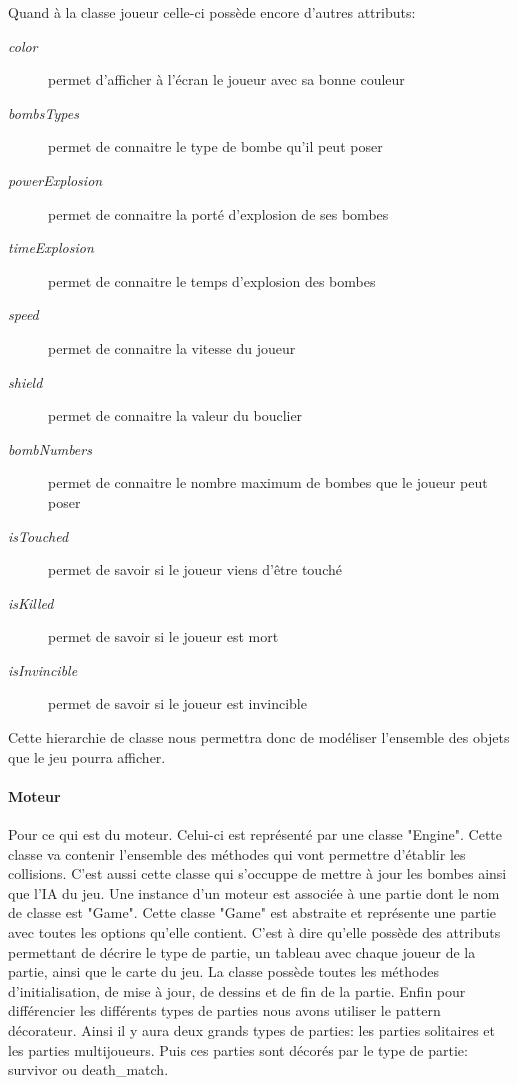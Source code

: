 	Quand à la classe joueur celle-ci possède encore d'autres attributs: 
	\begin{description}
		\item [\textit{color}]{permet d'afficher à l'écran le joueur avec sa bonne couleur}
		\item [\textit{bombsTypes}]{permet de connaitre le type de bombe qu'il peut poser}
		\item [\textit{powerExplosion}]{permet de connaitre la porté d'explosion de ses bombes}
		\item [\textit{timeExplosion}]{permet de connaitre le temps d'explosion des bombes}
		\item [\textit{speed}]{permet de connaitre la vitesse du joueur}
		\item [\textit{shield}]{permet de connaitre la valeur du bouclier}
		\item [\textit{bombNumbers}]{permet de connaitre le nombre maximum de bombes que le joueur peut poser}
		\item [\textit{isTouched}]{permet de savoir si le joueur viens d'être touché}
		\item [\textit{isKilled}]{permet de savoir si le joueur est mort}
		\item [\textit{isInvincible}]{permet de savoir si le joueur est invincible}
	\end{description}
	
	Cette hierarchie de classe nous permettra donc de modéliser l'ensemble des objets que le jeu pourra afficher.
	
	
	
	\paragraph{Moteur\\}
	
	Pour ce qui est du moteur. Celui-ci est représenté par une classe "Engine". Cette classe va contenir l'ensemble des méthodes qui vont permettre d'établir les collisions. C'est aussi cette classe qui s'occuppe de mettre à jour les bombes ainsi que l'IA du jeu. 
	Une instance d'un moteur est associée à une partie dont le nom de classe est "Game". Cette classe "Game" est abstraite et représente une partie avec toutes les options qu'elle contient. C'est à dire qu'elle possède des attributs permettant de décrire le type de partie, un tableau avec chaque joueur de la partie, ainsi que le carte du jeu. La classe possède toutes les méthodes d'initialisation, de mise à jour, de dessins et de fin de la partie. Enfin pour différencier les différents types de parties nous avons utiliser le \gls{pattern} décorateur. Ainsi il y aura deux grands types de parties: les parties solitaires et les parties multijoueurs. Puis ces parties sont décorés par le type de partie: \gls{survivor} ou \gls{death_match}.
	
